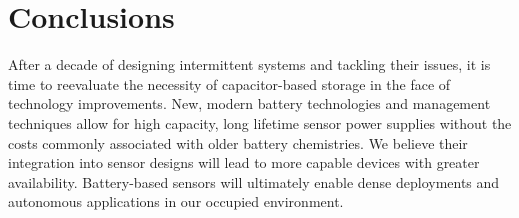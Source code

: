 \section{Conclusions}
\label{sec:conc}

After a decade of designing intermittent systems and tackling their issues, it
is time to reevaluate the necessity of capacitor-based storage in the face of technology improvements.
New, modern battery technologies and management techniques allow for high
capacity, long lifetime sensor power supplies without the costs commonly
associated with older battery chemistries. We believe their integration into
sensor designs will lead to more capable devices with greater availability.
Battery-based sensors will ultimately enable dense deployments and autonomous applications in
our occupied environment.


